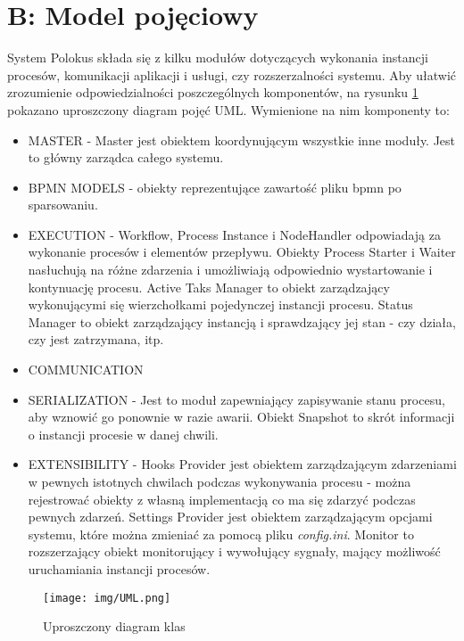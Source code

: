 \documentclass[declaration,shortabstract,mgr]{iithesis}
\newcommand{\bpmn}{BPMN }
\begin{document}
\newpage
\section*{B: Model pojęciowy}
System Polokus składa się z kilku modułów dotyczących wykonania instancji procesów, komunikacji aplikacji i usługi, czy rozszerzalności systemu. Aby ułatwić zrozumienie odpowiedzialności poszczególnych komponentów, na rysunku \ref{fig:uml} pokazano uproszczony diagram pojęć UML. Wymienione na nim komponenty to:
\begin{itemize}
    \item MASTER - Master jest obiektem koordynującym wszystkie inne moduły. Jest to główny zarządca całego systemu.
    \item BPMN MODELS - obiekty reprezentujące zawartość pliku bpmn po sparsowaniu.
    \item EXECUTION - Workflow, Process Instance i NodeHandler odpowiadają za wykonanie procesów i elementów przepływu. Obiekty Process Starter i Waiter nasłuchują na różne zdarzenia i umożliwiają odpowiednio wystartowanie i kontynuację procesu. Active Taks Manager to obiekt zarządzający wykonującymi się wierzchołkami pojedynczej instancji procesu. Status Manager to obiekt zarządzający instancją i sprawdzający jej stan - czy działa, czy jest zatrzymana, itp.
    \item COMMUNICATION
    \item SERIALIZATION - Jest to moduł zapewniający zapisywanie stanu procesu, aby wznowić go ponownie w razie awarii. Obiekt Snapshot to skrót informacji o instancji procesie w danej chwili.
    \item EXTENSIBILITY - Hooks Provider jest obiektem zarządzającym zdarzeniami w pewnych istotnych chwilach podczas wykonywania procesu - można rejestrować obiekty z własną implementacją co ma się zdarzyć podczas pewnych zdarzeń. Settings Provider jest obiektem zarządzającym opcjami systemu, które można zmieniać za pomocą pliku \textit{config.ini}. Monitor to rozszerzający obiekt monitorujący i wywołujący sygnały, mający możliwość uruchamiania instancji procesów.    
\end{itemize}

\newpage
\begin{figure}[H]
    \texttt{[image: img/UML.png]}
    \caption{Uproszczony diagram klas}
    \label{fig:uml}
\end{figure}
 \clearpage


\end{document}
